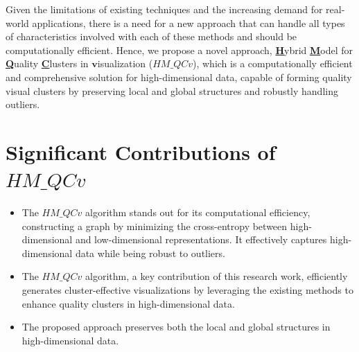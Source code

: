 Given the limitations of existing techniques and the increasing demand for real-world applications, there is a need for a new approach that can handle all types of characteristics involved with each of these methods and should be computationally efficient. Hence, we propose a novel approach, \textbf{\underline{H}}ybrid \textbf{\underline{M}}odel for \textbf{\underline{Q}}uality \textbf{\underline{C}}lusters in \underline{$\bm{v}$}isualization ($HM\_QCv$), which is a computationally efficient and comprehensive solution for high-dimensional data, capable of forming quality visual clusters by preserving local and global structures and robustly handling outliers. 






\section{Significant Contributions of \texorpdfstring{$HM\_QCv$}{HM\_QCv}}
\begin{itemize}
    \item The $HM\_QCv$ algorithm stands out for its computational efficiency, constructing a graph by minimizing the cross-entropy between high-dimensional and low-dimensional representations. It effectively captures high-dimensional data while being robust to outliers.
    \item The $HM\_QCv$ algorithm, a key contribution of this research work, efficiently generates cluster-effective visualizations by leveraging the existing methods to enhance quality clusters in high-dimensional data.
    \item The proposed approach preserves both the local and global structures in high-dimensional data.
\end{itemize}















